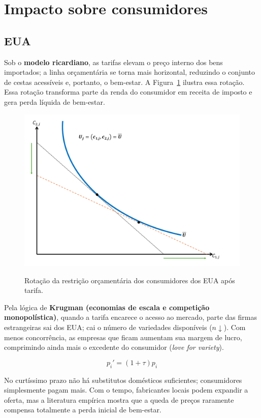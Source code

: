 \documentclass[a4paper,12pt]{article}[abntex2]
\begin{document}
\section*{\textbf{Impacto sobre consumidores}}

\subsection*{\textbf{EUA}}

Sob o \textbf{modelo ricardiano}, as tarifas elevam o preço interno dos bens importados; a linha orçamentária se torna mais horizontal, reduzindo o conjunto de cestas acessíveis e, portanto, o bem-estar. A Figura~\ref{fig:budget} ilustra essa rotação. Essa rotação transforma parte da renda do consumidor em receita de imposto e gera perda líquida de bem-estar. 

\begin{figure}[h]
  \centering
  \caption{Rotação da restrição orçamentária dos consumidores dos EUA após tarifa.}
  \includegraphics[width=0.7\linewidth]{Imagens/aps1i1.png}
  \label{fig:budget}
\end{figure}

Pela lógica de \textbf{Krugman (economias de escala e competição monopolística)}, quando a tarifa encarece o acesso ao mercado, parte das firmas estrangeiras sai dos EUA; cai o número de variedades disponíveis ($n\downarrow$). Com menos concorrência, as empresas que ficam aumentam sua margem de lucro, comprimindo ainda mais o excedente do consumidor (\emph{love for variety}).

\[
p_i' = (1+\tau) p_i
\]

No curtíssimo prazo não há substitutos domésticos suficientes; consumidores simplesmente pagam mais.  Com o tempo, fabricantes locais podem expandir a oferta, mas a literatura empírica mostra que a queda de preços raramente compensa totalmente a perda inicial de bem-estar.
\end{document}

